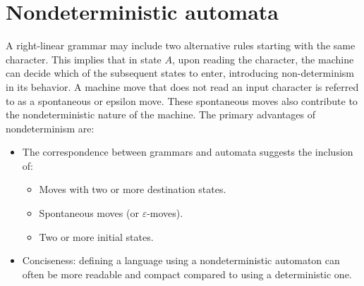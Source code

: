 \section{Nondeterministic automata}

A right-linear grammar may include two alternative rules starting with the same character. 
This implies that in state $A$, upon reading the character, the machine can decide which of the subsequent states to enter, introducing non-determinism in its behavior.
A machine move that does not read an input character is referred to as a spontaneous or epsilon move. 
These spontaneous moves also contribute to the nondeterministic nature of the machine.
The primary advantages of nondeterminism are:
\begin{itemize}
    \item The correspondence between grammars and automata suggests the inclusion of:
        \begin{itemize}
            \item Moves with two or more destination states.
            \item Spontaneous moves (or $\varepsilon$-moves).
            \item Two or more initial states.
        \end{itemize}
    \item Conciseness: defining a language using a nondeterministic automaton can often be more readable and compact compared to using a deterministic one.
\end{itemize}

